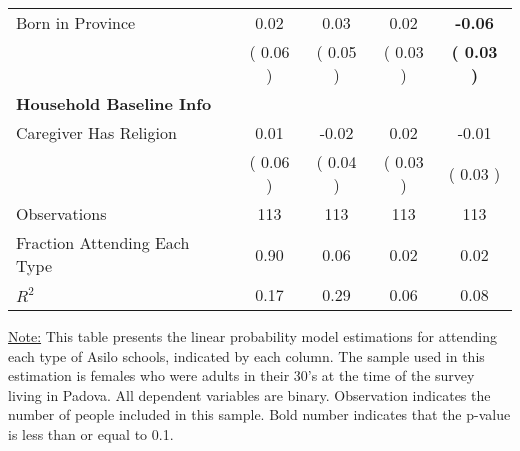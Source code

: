 \begin{table}[H]
{\begin{tabular}{lcccc}
\quad Born in Province &      0.02 &      0.03 &      0.02 & \textbf{    -0.06} \\
\quad  & (     0.06 ) & (     0.05 )  & (     0.03 )  & \textbf{(     0.03 )}  \\
\midrule
\textbf{Household Baseline Info} \\
\quad Caregiver Has Religion &      0.01 &     -0.02 &      0.02 &     -0.01 \\
\quad  & (     0.06 ) & (     0.04 )  & (     0.03 )  & (     0.03 )  \\
\midrule
Observations & 113 & 113 & 113 & 113 \\
Fraction Attending Each Type &      0.90 &      0.06 &      0.02 &      0.02 \\
\midrule
$ R^2$ &      0.17 &      0.29 &      0.06 &      0.08 \\
\bottomrule
\end{tabular}}
\end{table}
\begin{footnotesize}
\noindent\underline{Note:} This table presents the linear probability model estimations for attending each type of Asilo schools, indicated by each column. The sample used in this estimation is females who were adults in their 30's at the time of the survey living in Padova. All dependent variables are binary. Observation indicates the number of people included in this sample. Bold number indicates that the p-value is less than or equal to 0.1.
\end{footnotesize}
